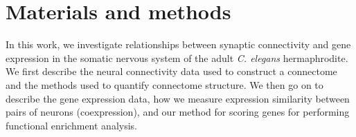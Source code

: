 \documentclass[10pt,letterpaper]{article}
\begin{document}


\section*{Materials and methods}

In this work, we investigate relationships between synaptic connectivity and gene expression in the somatic nervous system of the adult \textit{C. elegans} hermaphrodite.
We first describe the neural connectivity data used to construct a connectome and the methods used to quantify connectome structure.
We then go on to describe the gene expression data, how we measure expression similarity between pairs of neurons (coexpression), and our method for scoring genes for performing functional enrichment analysis.
\end{document}
